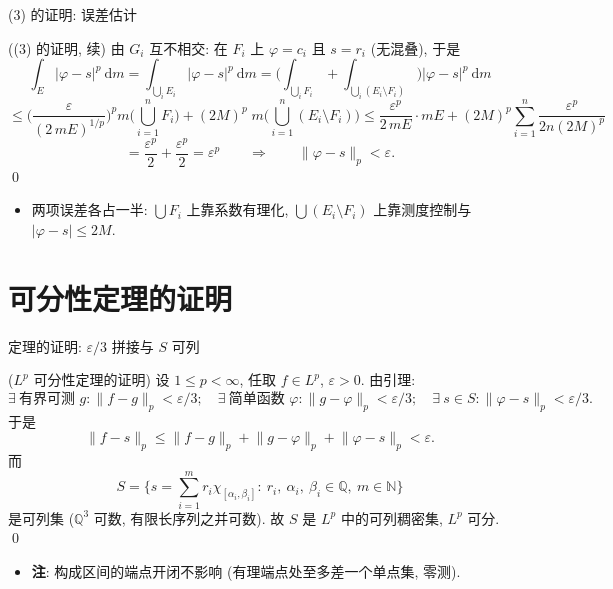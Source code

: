 
\begin{frame}{(3) 的证明: 误差估计}

\startproof[bg=yellow, fg=red]((3) 的证明, 续)
由 $G_i$ 互不相交: 在 $F_i$ 上 $\varphi = c_i$ 且 $s = r_i$ (无混叠), 于是
\[
\int_E |\varphi - s|^p ~ \mathrm{d} m
= \int_{\bigcup_i E_i} |\varphi - s|^p ~ \mathrm{d} m
= \Big( \int_{\bigcup_i F_i} + \int_{\bigcup_i (E_i \setminus F_i)} \Big)
| \varphi - s |^p ~ \mathrm{d} m
\]
\pause
\[
\leqslant \Big( \frac{\varepsilon}{(2 \, mE)^{1/p}} \Big)^{\!p}
m \Big( \bigcup_{i=1}^{n} F_i \Big)
+ (2M)^p \; m \Big( \bigcup_{i=1}^{n} (E_i \setminus F_i) \Big)
\leqslant \frac{\varepsilon^p}{2 \, mE} \cdot mE
+ (2M)^p \sum_{i=1}^{n} \frac{\varepsilon^p}{2n (2M)^p}
\]
\[
= \frac{\varepsilon^p}{2} + \frac{\varepsilon^p}{2}
= \varepsilon^p
\qquad \Longrightarrow \qquad
\lVert \varphi - s \rVert_p < \varepsilon .
\]
\qed

\pause

\begin{itemize}
\item 两项误差各占一半: $\bigcup F_i$ 上靠\alert{系数有理化},
  $\bigcup (E_i \setminus F_i)$ 上靠\alert{测度控制}与 $|\varphi - s| \leqslant 2M$.
\end{itemize}

\end{frame}


\section[可分性证明]{可分性定理的证明}


\begin{frame}{定理的证明: $\varepsilon/3$ 拼接与 $S$ 可列}

\startproof[bg=yellow, fg=red]($L^p$ 可分性定理的证明)
设 $1 \leqslant p < \infty$, 任取 $f \in L^p$, $\varepsilon > 0$. 由引理:
\[
\exists\ \text{有界可测 } g: \lVert f - g \rVert_p < \varepsilon/3;
\quad
\exists\ \text{简单函数 } \varphi: \lVert g - \varphi \rVert_p < \varepsilon/3;
\quad
\exists\ s \in S: \lVert \varphi - s \rVert_p < \varepsilon/3 .
\]
于是
\[
\lVert f - s \rVert_p
\leqslant \lVert f - g \rVert_p + \lVert g - \varphi \rVert_p
+ \lVert \varphi - s \rVert_p
< \varepsilon .
\]
\pause
而
\[
S = \Big\{ s = \sum_{i=1}^{m} r_i \chi_{[\alpha_i, \beta_i]}
:\ r_i,\ \alpha_i,\ \beta_i \in \mathbb{Q},\ m \in \mathbb{N} \Big\}
\]
是可列集 ($\mathbb{Q}^3$ 可数, 有限长序列之并可数).
故 $S$ 是 $L^p$ 中的可列稠密集, $L^p$ 可分.
\qed

\pause

\begin{itemize}
\item \textbf{注}: 构成区间的端点开闭不影响 (有理端点处至多差一个单点集, 零测).
\end{itemize}

\end{frame}

